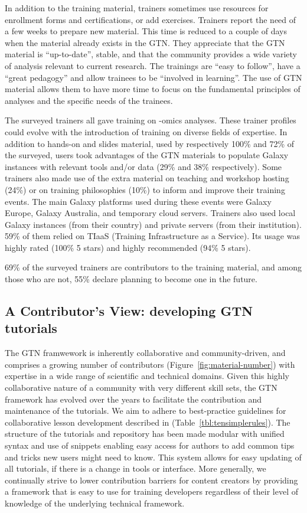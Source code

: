 \documentclass[10pt,letterpaper]{article}
\begin{document}
In addition to the training material, trainers sometimes use resources for enrollment forms and certifications, or add exercises.
Trainers report the need of a few weeks to prepare new material.
This time is reduced to a couple of days when the material already exists in the GTN.
They appreciate that the GTN material is “up-to-date”, stable, and that the community provides a wide variety of analysis relevant to current research.
The trainings are “easy to follow”, have a “great pedagogy” and allow trainees to be “involved in learning”.
The use of GTN material allows them to have more time to focus on the fundamental principles of  analyses and the specific needs of the trainees.

The surveyed trainers all gave training on -omics analyses.
These trainer profiles could evolve with the introduction of training on diverse fields of expertise. In addition to hands-on and slides material, used by respectively 100\% and 72\% of the surveyed, users took advantages of the GTN materials to populate Galaxy instances with relevant tools and/or data (29\% and 38\% respectively).
Some trainers also made use of the extra material on teaching and workshop hosting (24\%) or on training philosophies (10\%) to inform and improve their training events.
The main Galaxy platforms used during these events were Galaxy Europe, Galaxy  Australia, and temporary cloud servers. Trainers also used local Galaxy instances (from their country) and  private servers (from their institution).
59\% of them relied on TIaaS (Training Infrastructure as a Service). Its usage was highly rated (100\% 5 stars) and highly recommended (94\% 5 stars).

69\% of the surveyed trainers are contributors to the training material, and among those who are not, 55\% declare planning to become one in the future.

\subsection*{A Contributor's View: developing GTN tutorials}

The GTN framwework is inherently collaborative and community-driven, and comprises a growing number of contributors (Figure~\ref{fig:material-number})  with expertise in a wide range of scientific and technical domains. Given this highly collaborative nature of a community with very different skill sets, the GTN framework has evolved over the years to facilitate the contribution and maintenance of the tutorials. We aim to adhere to best-practice guidelines for collaborative lesson development described in \cite{Devenyi_2018} (Table~\ref{tbl:tensimplerules}). The structure of the tutorials and repository has been made modular with unified syntax and use of snippets enabling easy access for authors to add common tips and tricks new users might need to know. This system allows for easy updating of all tutorials, if there is a change in tools or interface. More generally, we continually strive to lower contribution barriers for content creators by providing a framework that is easy to use for training developers regardless of their level of knowledge of the underlying technical framework.
\end{document}

